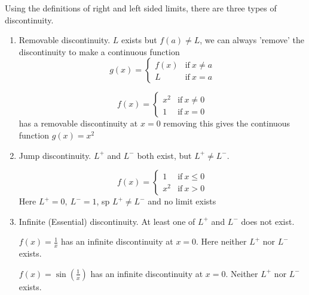 \documentclass[10pt, a4paper]{article}
\begin{document}
Using the definitions of right and left sided limits, there are three types of discontinuity.
\begin{enumerate}[label = \roman*)]
    \item Removable discontinuity. $L$ exists but $f(a) \neq L$, we can always 'remove' the discontinuity to make a continuous function
    \[
    g(x) = \begin{cases}
        f(x) &\text{if}\ x \neq a \\
        L &\text{if}\ x = a
    \end{cases}
    \]

    \begin{example}
        \[
        f(x) = \begin{cases}
            x ^ 2 &\text{if}\ x \neq 0 \\
            1 &\text{if}\ x = 0
        \end{cases}
        \]
        has a removable discontinuity at $x = 0$ removing this gives the continuous function $g(x) = x ^ 2$
    \end{example}
    
    \item Jump discontinuity. $L ^ +$ and $L ^ -$ both exist, but $L ^ + \neq L ^ -$.
    \begin{example}
        \[
        f(x) = \begin{cases}
            1 &\text{if}\ x \leq 0 \\
            x ^ 2 &\text{if}\ x > 0
        \end{cases}
        \]
        Here $L ^ + = 0,\ L ^ - = 1$, sp $L ^ + \neq L ^ -$ and no limit exists
    \end{example}

    \item Infinite (Essential) discontinuity. At least one of $L ^ +$ and $L ^ -$ does not exist.
    \begin{example}
        $f(x) = \frac{1}{x}$ has an infinite discontinuity at $x = 0$. Here neither $L ^ +$ nor $L ^ -$ exists.
    \end{example}
    \begin{example}
        $f(x) = \sin\left(\frac{1}{x}\right)$ has an infinite discontinuity at $x = 0$. Neither $L ^ +$ nor $L ^ -$ exists.
    \end{example}
\end{enumerate}
\end{document}
